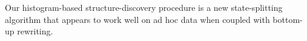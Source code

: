 Our histogram-based structure-discovery procedure is a new state-splitting
algorithm that appears to work well on ad hoc data when coupled with
bottom-up rewriting.



